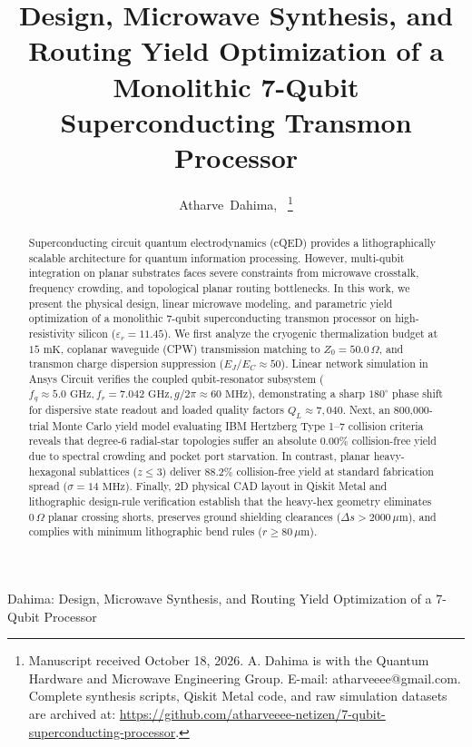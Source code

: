 \documentclass[10pt,journal,compsoc]{IEEEtran}
\begin{document}
\title{Design, Microwave Synthesis, and Routing Yield Optimization of a Monolithic 7-Qubit Superconducting Transmon Processor}

\author{Atharve~Dahima,~%
\thanks{Manuscript received October 18, 2026. A. Dahima is with the Quantum Hardware and Microwave Engineering Group. E-mail: atharveeee@gmail.com. Complete synthesis scripts, Qiskit Metal code, and raw simulation datasets are archived at: \url{https://github.com/atharveeee-netizen/7-qubit-superconducting-processor}.}}

%
{Dahima: Design, Microwave Synthesis, and Routing Yield Optimization of a 7-Qubit Processor}

\maketitle

\begin{abstract}
Superconducting circuit quantum electrodynamics (cQED) provides a lithographically scalable architecture for quantum information processing. However, multi-qubit integration on planar substrates faces severe constraints from microwave crosstalk, frequency crowding, and topological planar routing bottlenecks. In this work, we present the physical design, linear microwave modeling, and parametric yield optimization of a monolithic 7-qubit superconducting transmon processor on high-resistivity silicon ($\varepsilon_r = 11.45$). We first analyze the cryogenic thermalization budget at $15\text{ mK}$, coplanar waveguide (CPW) transmission matching to $Z_0 = 50.0\,\Omega$, and transmon charge dispersion suppression ($E_J/E_C \approx 50$). Linear network simulation in Ansys Circuit verifies the coupled qubit-resonator subsystem ($f_q \approx 5.0\text{ GHz}, f_r = 7.042\text{ GHz}, g/2\pi \approx 60\text{ MHz}$), demonstrating a sharp $180^\circ$ phase shift for dispersive state readout and loaded quality factors $Q_L \approx 7{,}040$. Next, an 800,000-trial Monte Carlo yield model evaluating IBM Hertzberg Type 1--7 collision criteria reveals that degree-6 radial-star topologies suffer an absolute $0.00\%$ collision-free yield due to spectral crowding and pocket port starvation. In contrast, planar heavy-hexagonal sublattices ($z \le 3$) deliver $88.2\%$ collision-free yield at standard fabrication spread ($\sigma = 14\text{ MHz}$). Finally, 2D physical CAD layout in Qiskit Metal and lithographic design-rule verification establish that the heavy-hex geometry eliminates $0\,\Omega$ planar crossing shorts, preserves ground shielding clearances ($\Delta s > 2000\,\mu\text{m}$), and complies with minimum lithographic bend rules ($r \ge 80\,\mu\text{m}$).
\end{abstract}
\end{document}
